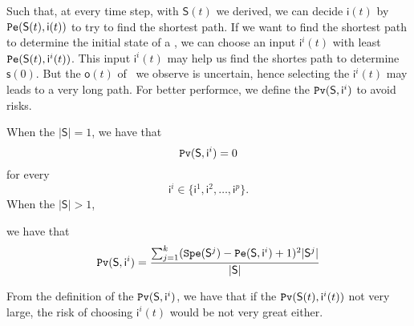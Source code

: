 Such that, at every time step, with $\mathsf{S}(t)$ we derived, we can decide $\mathsf{i}(t)$ by ${\tt Pe}(\mathsf{S}(t),\mathsf{ i}(t))$ to try to find the shortest path. If we want to find the shortest path to determine the initial state of a \BCN, we can choose an input $\mathsf{ i}^{i}(t)$ with least ${\tt Pe}(\mathsf{S}(t), \mathsf{ i}^{i}(t))$. This input $\mathsf{i}^{i}(t)$ may help us find the shortes path to determine $\mathsf{s}(0)$. But the $\mathsf{o}(t)$ of \BCNs\ we observe is uncertain, hence selecting the $\mathsf{ i}^{i}(t)$ may leads to a very long path. For better performce, we define the ${\tt Pv}(\mathsf{S}, \mathsf{ i}^{i})$ to avoid risks.
\begin{definition} 
When the $|\mathsf{S}|=1$, we have that
\[{\tt Pv}(\mathsf{S}, \mathsf{ i}^{i})=0\]  for every \[\mathsf{ i}^{i} \in \{\mathsf{ i}^{1},\mathsf{ i}^{2},\ldots, \mathsf{ i}^{p}\}.\]  When the $|\mathsf{S}|>1$, 

we have that\\ 
\begin{equation}
\begin{split}
{\tt Pv}(\mathsf{S}, \mathsf{ i}^{i})=\frac{\sum_{j=1}^k ({\tt Spe}(\mathsf{S}^{j})-{\tt Pe}(\mathsf{S}, \mathsf{ i}^{i})+1)^2 |\mathsf{S}^{j}|}{ |\mathsf{S}|}
\end{split}
\end{equation}
\end{definition}

From the definition of the ${\tt Pv}(\mathsf{S}, \mathsf{ i}^{i})$, we have that if the ${\tt Pv}(\mathsf{S}(t), \mathsf{i}^{i}(t))$ not very large, the risk of choosing $\mathsf{ i}^{i}(t)$ would be not very great either.
